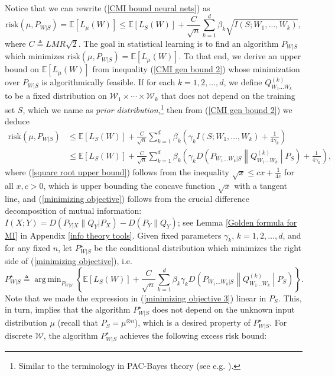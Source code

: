 \documentclass{article}
\DeclareMathOperator*{\argmin}{arg\,min}
\newcommand{\E}{\mathbb{E}}
\newcommand{\risk}[0]{\mathrm{risk}}
\newcommand{\W}[0]{\mathcal{W}}
\begin{document}
Notice that we can rewrite (\ref{CMI bound neural nets}) as 
\begin{equation}\label{CMI gen bound 2}
	\risk\left(\mu, P_{W|S}\right)=\E[L_{\mu}(W)]\leq \E[L_S(W)]+\frac{C}{\sqrt{n}}\sum_{k=1}^d \beta_k\sqrt{I(S;W_1,\dots,W_k)},
\end{equation}
where $C\triangleq LMR\sqrt{2}$. The goal in statistical learning is to find an algorithm $P_{W|S}$ which minimizes $\risk\left(\mu, P_{W|S}\right)= \E[L_{\mu}(W)].$
To that end, we derive an upper bound on $\E[L_{\mu}(W)]$ from inequality (\ref{CMI gen bound 2}) whose minimization over $P_{W|S}$ is algorithmically feasible.
If for each $k=1,2,\dots, d$, we define $Q^{(k)}_{W_1\dots W_k}$ to be a fixed distribution on $\mathcal{W}_1\times \cdots \times \mathcal{W}_k$ that does not depend on the training set $S$, which we name as \emph{prior distribution},\footnote{Similar to the terminology in PAC-Bayes theory (see e.g. \cite{catoni2007pac}). 
} 
then from (\ref{CMI gen bound 2}) we deduce 
\begin{align}
	\risk\left(\mu, P_{W|S}\right)&\leq \E[L_S(W)]+\frac{C}{\sqrt{n}}\sum_{k=1}^d \beta_k\left(\gamma_k I(S;W_1,\dots,W_k)+\frac{1}{4\gamma_k}\right)\label{square root upper bound}\\
	     					&\leq \E[L_S(W)]+\frac{C}{\sqrt{n}}\sum_{k=1}^d \beta_k\left(\gamma_k D\left(P_{W_1\dots W_k|S}\middle\|Q^{(k)}_{W_1\dots W_k}\middle|P_S\right)+\frac{1}{4\gamma_k}\right),\label{minimizing objective}
\end{align}
where (\ref{square root upper bound}) follows from the inequality 
$
		\sqrt{x}\leq cx+\frac{1}{4c}  
	$ for all $x,c>0$,
which is upper bounding the concave function $\sqrt{x}$ with a tangent line, and (\ref{minimizing objective}) follows from the crucial difference decomposition of mutual information: $I(X;Y)=D(P_{Y|X}\|Q_Y|P_X)-D(P_Y\|Q_Y)$; see Lemma \ref{Golden formula for MI} in Appendix \ref{info theory tools}. 
Given fixed parameters $\gamma_k$, $k=1,2,\dots,d$, and for any fixed $n$, let $P^{\star}_{W|S}$ be the conditional distribution which minimizes the right side of (\ref{minimizing objective}), i.e. 
\begin{equation}\label{minimizing objective 3}
	P^{\star}_{W|S}\triangleq \argmin_{P_{W|S}} \left\{ \E[L_S(W)]+\frac{C}{\sqrt{n}}\sum_{k=1}^d \beta_k\gamma_k D\left(P_{W_1\dots W_k|S}\middle\|Q^{(k)}_{W_1\dots W_k}\middle|P_S\right)\right\}.
\end{equation}
Note that we made the expression in (\ref{minimizing objective 3}) linear in $P_S$. This, in turn, implies that the algorithm $P^{\star}_{W|S}$ does not depend on the unknown input distribution $\mu$ (recall that $P_S=\mu^{\otimes n}$), which is a desired property of $P^{\star}_{W|S}$. For discrete $\W$, the algorithm $P_{W|S}^{\star}$ achieves the following excess risk bound: 
\end{document}
